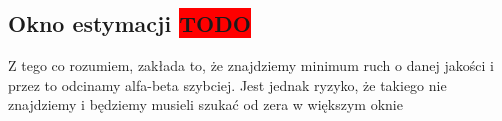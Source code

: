 \subsection{Okno estymacji \colorbox{red}{TODO}}
\label{subsec:okno-estymacji}

{
    \color{red}
    \large Z tego co rozumiem, zakłada to, że znajdziemy minimum ruch o danej jakości i przez to odcinamy alfa-beta szybciej.
Jest jednak ryzyko, że takiego nie znajdziemy i będziemy musieli szukać od zera w większym oknie
}